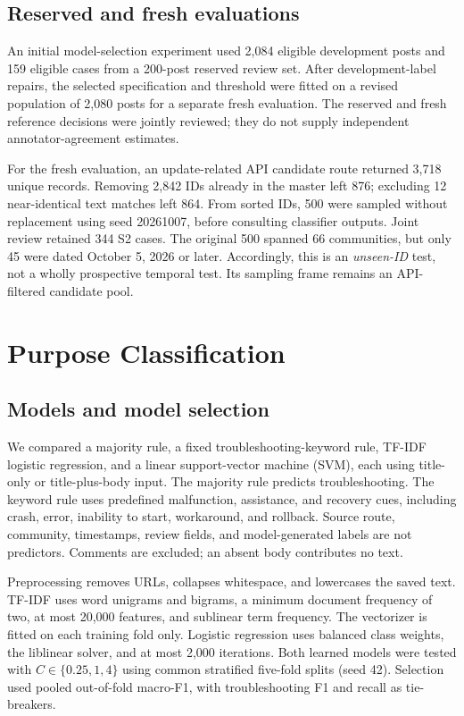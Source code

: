 \documentclass[conference,letterpaper]{IEEEtran}
\begin{document}
\subsection{Reserved and fresh evaluations}
An initial model-selection experiment used 2,084 eligible development posts and 159 eligible cases from a 200-post reserved review set. After development-label repairs, the selected specification and threshold were fitted on a revised population of 2,080 posts for a separate fresh evaluation. The reserved and fresh reference decisions were jointly reviewed; they do not supply independent annotator-agreement estimates.

For the fresh evaluation, an update-related API candidate route returned 3,718 unique records. Removing 2,842 IDs already in the master left 876; excluding 12 near-identical text matches left 864. From sorted IDs, 500 were sampled without replacement using seed 20261007, before consulting classifier outputs. Joint review retained 344 S2 cases. The original 500 spanned 66 communities, but only 45 were dated October 5, 2026 or later. Accordingly, this is an \emph{unseen-ID} test, not a wholly prospective temporal test. Its sampling frame remains an API-filtered candidate pool.

\section{Purpose Classification}
\subsection{Models and model selection}
We compared a majority rule, a fixed troubleshooting-keyword rule, TF-IDF logistic regression, and a linear support-vector machine (SVM), each using title-only or title-plus-body input. The majority rule predicts troubleshooting. The keyword rule uses predefined malfunction, assistance, and recovery cues, including crash, error, inability to start, workaround, and rollback. Source route, community, timestamps, review fields, and model-generated labels are not predictors. Comments are excluded; an absent body contributes no text.

Preprocessing removes URLs, collapses whitespace, and lowercases the saved text. TF-IDF uses word unigrams and bigrams, a minimum document frequency of two, at most 20,000 features, and sublinear term frequency. The vectorizer is fitted on each training fold only. Logistic regression uses balanced class weights, the liblinear solver, and at most 2,000 iterations. Both learned models were tested with $C\in\{0.25,1,4\}$ using common stratified five-fold splits (seed 42). Selection used pooled out-of-fold macro-F1, with troubleshooting F1 and recall as tie-breakers.
\end{document}
